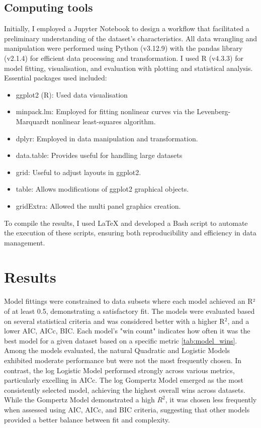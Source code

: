 \documentclass[11pt]{article}
\begin{document}
\subsection*{Computing tools}
Initially, I employed a Jupyter Notebook to design a workflow that facilitated a preliminary understanding of the dataset's characteristics. All data wrangling and manipulation were performed using Python (v3.12.9) with the pandas library (v2.1.4) for efficient data processing and transformation. I used R (v4.3.3) for model fitting, visualisation, and evaluation with plotting and statistical analysis.
Essential packages used included: 
\begin{itemize}
    \item ggplot2 (R): Used data visualisation \parencite{Wickham2016}
    \item minpack.lm: Employed for fitting nonlinear curves via the Levenberg-Marquardt nonlinear least-squares algorithm. 
    \item dplyr: Employed in data manipulation and transformation.
    \item data.table: Provides useful for handling large datasets
    \item grid: Useful to adjust layouts in ggplot2. 
    \item table: Allows modifications of ggplot2 graphical objects.
    \item gridExtra: Allowed the multi panel graphics creation. 
\end{itemize}
To compile the results, I used LaTeX and developed a Bash script to automate the execution of these scripts, ensuring both reproducibility and efficiency in data management.

\section*{Results}

Model fittings were constrained to data subsets where each model achieved an R² of at least 0.5, demonstrating a satisfactory fit. The models were evaluated based on several statistical criteria and was considered better with a higher R$^2$, and a lower AIC, AICc, BIC. Each model's "win count" indicates how often it was the best model for a given dataset based on a specific metric \autoref{tab:model_wins}. Among the models evaluated, the natural Quadratic and Logistic Models exhibited moderate performance but were not the most frequently chosen. In contrast, the log Logistic Model performed strongly across various metrics, particularly excelling in AICc. The log Gompertz Model emerged as the most consistently selected model, achieving the highest overall wins across datasets. While the Gompertz Model demonstrated a high \( R^2 \), it was chosen less frequently when assessed using AIC, AICc, and BIC criteria, suggesting that other models provided a better balance between fit and complexity. 
\end{document}

